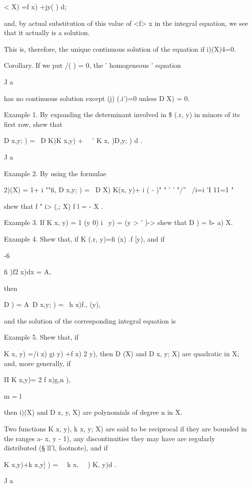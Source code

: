 < X) =f x) +jy( ) d;

and, by actual substitution of this value of <f> x in the integral
equation, we see that it actually is a solution.

This is, therefore, the unique continuous solution of the equation if
i)(X)4=0.

Corollary. If we put /( ) = 0, the ' homogeneous ' equation

J a

has no continuous solution except (j) (.i')=0 unless D X) = 0.

Example 1. By expanding the determinant involved in \$ (.r, y) in
minors of its first row, shew that

D x,y; ) = \ D K)K x,y) + \ \ ' K x, )D,y; ) d .

J a

Example 2. By using the formulae

2)(X) = 1+ i ""fi, D x,y; ) = \ D X) K(x, y)+ i ( - )" " ' ' "/'' \
/i=i 'I 11=1 " 

shew that f " i> (,; X) f l = - X .

Example 3. If K x, y) = 1 (y 0) i \ y) = (y > ' )-> shew that D ) = b-
a) X.

Example 4. Shew that, if K (.r, y)=fi (x) .f [y), and if

-6

fi )f2 x)dx = A,

then

D ) = A\ D x,y; ) = \ h x)f., (y),

and the solution of the corresponding integral equation is

%
%

Example 5. Shew that, if

K x, y) =/i x) gi y) +f x) 2 y), then D (X) and D x, y; X) are
quadratic in X; and, more generally, if

II K x,y)= 2 f x)g,n ),

m = l

then i)(X) and D x, y, X) are polynomials of degree n in X.


Two functions K x, y), k x, y; X) are said to be reciprocal if they
are bounded in the ranges a- x, y - 1), any discontinuities they may
have are regularly distributed (§ ll'l, footnote), and if

K x,y)+k x,y] ) = \ \ k x, \ \ ) K, y)d .

J a

